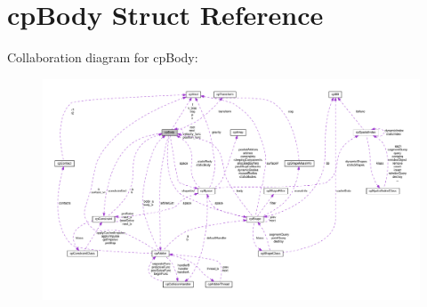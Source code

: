 \hypertarget{structcpBody}{}\section{cp\+Body Struct Reference}
\label{structcpBody}


Collaboration diagram for cp\+Body\+:
\nopagebreak
\begin{figure}[H]
\begin{center}
\leavevmode
\includegraphics[width=350pt]{structcpBody__coll__graph}
\end{center}
\end{figure}

